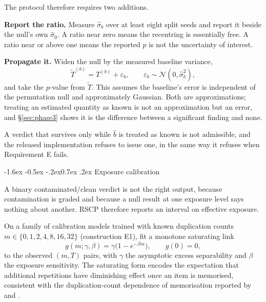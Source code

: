 \documentclass[10pt,twocolumn,letterpaper]{article}
\makeatletter
\renewcommand\subsection{\@startsection{subsection}{2}{\z@}%
  {-1.6ex \@plus -0.5ex \@minus -.2ex}{0.7ex \@plus .2ex}%
  {\normalfont\normalsize\bfseries}}
\makeatother
\begin{document}
The protocol therefore requires two additions.

\textbf{Report the ratio.} Measure $\hat\sigma_{b}$ over at least eight split seeds and report it beside the null's own $\hat\sigma_{0}$. A ratio near zero means the recentring is essentially free. A ratio near or above one means the reported $p$ is not the uncertainty of interest.

\textbf{Propagate it.} Widen the null by the measured baseline variance,
\begin{equation}
\tilde T^{(b)} = T^{(b)} + \varepsilon_b,\qquad \varepsilon_b\sim\mathcal{N}(0,\hat\sigma_{b}^{2}),
\end{equation}
and take the $p$-value from $\tilde T$. This assumes the baseline's error is independent of the permutation null and approximately Gaussian. Both are approximations; treating an estimated quantity as known is not an approximation but an error, and \S\ref{sec:phase3} shows it is the difference between a significant finding and none.

A verdict that survives only while $\hat b$ is treated as known is not admissible, and the released implementation refuses to issue one, in the same way it refuses when Requirement E fails.

\subsection{Exposure calibration}
\label{sec:calibration}

A binary contaminated/clean verdict is not the right output, because contamination is graded and because a null result at one exposure level says nothing about another. RSCP therefore reports an interval on effective exposure.

On a family of calibration models trained with known duplication counts $m\in\{0,1,2,4,8,16,32\}$ (construction E1), fit a monotone saturating link
\begin{equation}
g(m;\gamma,\beta) = \gamma\big(1-e^{-\beta m}\big),\qquad g(0)=0,
\label{eq:link}
\end{equation}
to the observed $(m, T)$ pairs, with $\gamma$ the asymptotic excess separability and $\beta$ the exposure sensitivity. The saturating form encodes the expectation that additional repetitions have diminishing effect once an item is memorised, consistent with the duplication-count dependence of memorisation reported by \citet{carlini2023quantifying} and \citet{kandpal2022dedup}.
\end{document}
